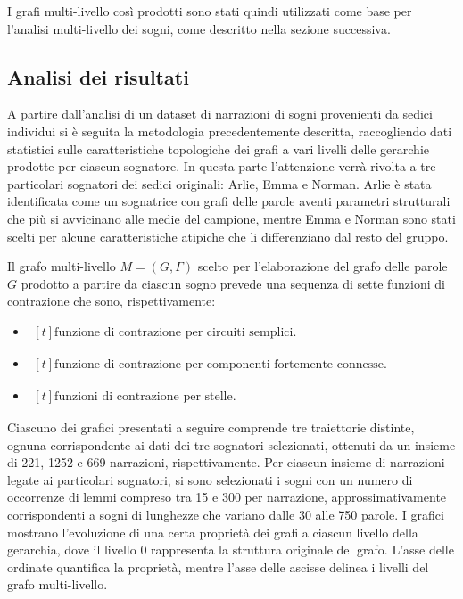 I grafi multi-livello così prodotti sono stati quindi utilizzati come base per l'analisi multi-livello dei sogni,
come descritto nella sezione successiva.

\subsection{Analisi dei risultati}
A partire dall'analisi di un dataset di narrazioni di sogni provenienti da sedici individui si è seguita la
metodologia precedentemente descritta, raccogliendo dati statistici sulle caratteristiche topologiche
dei grafi a vari livelli delle gerarchie prodotte per ciascun sognatore.
In questa parte l'attenzione verrà rivolta a tre particolari sognatori dei sedici originali: Arlie, Emma e Norman.
Arlie è stata identificata come un sognatrice con grafi delle parole aventi parametri strutturali che più si
avvicinano alle medie del campione, mentre Emma e Norman sono stati scelti per alcune caratteristiche atipiche
che li differenziano dal resto del gruppo.

Il grafo multi-livello $M = (G, \Gamma)$ scelto per l'elaborazione del grafo delle parole $G$ prodotto a partire
da ciascun sogno prevede una sequenza di sette funzioni di contrazione che sono, rispettivamente:
\begin{itemize}
    \item {}
    $ \begin{aligned}[t]
      \text{funzione di contrazione per circuiti semplici.}
      \end{aligned} $
    \item {}
    $ \begin{aligned}[t]
      \text{funzione di contrazione per componenti fortemente connesse.}
      \end{aligned} $
    \item {}
    $ \begin{aligned}[t]
      \text{funzioni di contrazione per stelle.}
      \end{aligned} $
\end{itemize}

Ciascuno dei grafici presentati a seguire comprende tre traiettorie distinte, ognuna corrispondente ai dati
dei tre sognatori selezionati, ottenuti da un insieme di 221, 1252 e 669 narrazioni, rispettivamente.
Per ciascun insieme di narrazioni legate ai particolari sognatori, si sono selezionati i sogni con un numero di
occorrenze di lemmi compreso tra 15 e 300 per narrazione, approssimativamente corrispondenti a sogni
di lunghezze che variano dalle 30 alle 750 parole.
I grafici mostrano l'evoluzione di una certa proprietà dei grafi a ciascun livello della gerarchia,
dove il livello $0$ rappresenta la struttura originale del grafo.
L'asse delle ordinate quantifica la proprietà, mentre l'asse delle ascisse delinea i livelli del grafo multi-livello.

